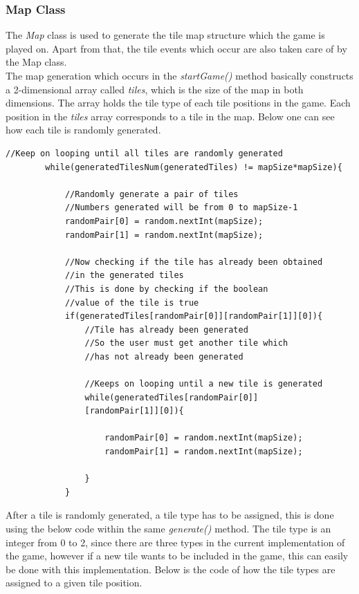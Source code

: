 \documentclass[a4paper,12pt]{extarticle}
\begin{document}
\subsubsection{Map Class}
\noindent The \textit{Map} class is used to generate the tile map structure which the game is played on. Apart from that, the tile events which occur are also taken care of by the Map class.\\

\noindent The map generation which occurs in the \textit{startGame()} method basically constructs a 2-dimensional array called \textit{tiles}, which is the size of the map in both dimensions. The array holds the tile type of each tile positions in the game. Each position in the \textit{tiles} array corresponds to a tile in the map. Below one can see how each tile is randomly generated.

\begin{lstlisting}
//Keep on looping until all tiles are randomly generated
        while(generatedTilesNum(generatedTiles) != mapSize*mapSize){

            //Randomly generate a pair of tiles
            //Numbers generated will be from 0 to mapSize-1
            randomPair[0] = random.nextInt(mapSize);
            randomPair[1] = random.nextInt(mapSize);

            //Now checking if the tile has already been obtained 
            //in the generated tiles
            //This is done by checking if the boolean 
            //value of the tile is true
            if(generatedTiles[randomPair[0]][randomPair[1]][0]){
                //Tile has already been generated
                //So the user must get another tile which
                //has not already been generated

                //Keeps on looping until a new tile is generated
                while(generatedTiles[randomPair[0]]
                [randomPair[1]][0]){

                    randomPair[0] = random.nextInt(mapSize);
                    randomPair[1] = random.nextInt(mapSize);

                }
            }
\end{lstlisting}
\vspace{4mm}

\noindent After a tile is randomly generated, a tile type has to be assigned, this is done using the below code within the same \textit{generate()} method. The tile type is an integer from 0 to 2, since there are three types in the current implementation of the game, however if a new tile wants to be included in the game, this can easily be done with this implementation. Below is the code of how the tile types are assigned to a given tile position.
\end{document}
